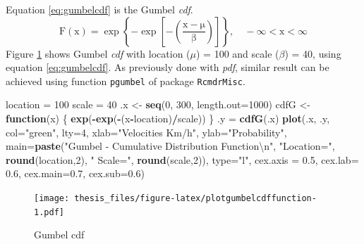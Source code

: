 \documentclass[12pt,oneside]{reedthesis}
\newenvironment{Shaded}{\begin{snugshade}}{\end{snugshade}}
\newcommand{\CharTok}[1]{\textcolor[rgb]{0.31,0.60,0.02}{#1}}
\newcommand{\ControlFlowTok}[1]{\textcolor[rgb]{0.13,0.29,0.53}{\textbf{#1}}}
\newcommand{\DataTypeTok}[1]{\textcolor[rgb]{0.13,0.29,0.53}{#1}}
\newcommand{\DecValTok}[1]{\textcolor[rgb]{0.00,0.00,0.81}{#1}}
\newcommand{\FloatTok}[1]{\textcolor[rgb]{0.00,0.00,0.81}{#1}}
\newcommand{\KeywordTok}[1]{\textcolor[rgb]{0.13,0.29,0.53}{\textbf{#1}}}
\newcommand{\NormalTok}[1]{#1}
\newcommand{\OperatorTok}[1]{\textcolor[rgb]{0.81,0.36,0.00}{\textbf{#1}}}
\newcommand{\StringTok}[1]{\textcolor[rgb]{0.31,0.60,0.02}{#1}}
\begin{document}
Equation \eqref{eq:gumbelcdf} is the Gumbel \emph{cdf}.
\begin{equation}
\mathrm{
        F(x) = \exp\left\{-\exp\left[-\left(\frac{x-\mu}{\beta}\right)\right]\right\}, 
        \quad -\infty < x < \infty
        }
  \label{eq:gumbelcdf}
\end{equation}
Figure \ref{fig:plotgumbelcdffunction} shows Gumbel \emph{cdf} with location (\(\mu\)) = 100 and scale (\(\beta\)) = 40, using equation \eqref{eq:gumbelcdf}. As previously done with \emph{pdf}, similar result can be achieved using function \texttt{pgumbel} of package \texttt{RcmdrMisc}.

\footnotesize
\begin{Shaded}
\begin{Highlighting}[]
\NormalTok{location =}\StringTok{ }\DecValTok{100}
\NormalTok{scale =}\StringTok{ }\DecValTok{40}
\NormalTok{.x <-}\StringTok{ }\KeywordTok{seq}\NormalTok{(}\DecValTok{0}\NormalTok{, }\DecValTok{300}\NormalTok{, }\DataTypeTok{length.out=}\DecValTok{1000}\NormalTok{)}
\NormalTok{cdfG <-}\StringTok{ }\ControlFlowTok{function}\NormalTok{(x) \{}
  \KeywordTok{exp}\NormalTok{(}\OperatorTok{-}\KeywordTok{exp}\NormalTok{(}\OperatorTok{-}\NormalTok{(x}\OperatorTok{-}\NormalTok{location)}\OperatorTok{/}\NormalTok{scale))}
\NormalTok{  \}}
\NormalTok{.y =}\StringTok{ }\KeywordTok{cdfG}\NormalTok{(.x)}
\KeywordTok{plot}\NormalTok{(.x, .y, }\DataTypeTok{col=}\StringTok{"green"}\NormalTok{, }\DataTypeTok{lty=}\DecValTok{4}\NormalTok{, }
     \DataTypeTok{xlab=}\StringTok{"Velocities Km/h"}\NormalTok{, }\DataTypeTok{ylab=}\StringTok{"Probability"}\NormalTok{, }
     \DataTypeTok{main=}\KeywordTok{paste}\NormalTok{(}\StringTok{"Gumbel - Cumulative Distribution Function}\CharTok{\textbackslash{}n}\StringTok{"}\NormalTok{, }\StringTok{"Location="}\NormalTok{, }
     \KeywordTok{round}\NormalTok{(location,}\DecValTok{2}\NormalTok{), }\StringTok{" Scale="}\NormalTok{, }\KeywordTok{round}\NormalTok{(scale,}\DecValTok{2}\NormalTok{)), }\DataTypeTok{type=}\StringTok{"l"}\NormalTok{, }
     \DataTypeTok{cex.axis =} \FloatTok{0.5}\NormalTok{, }\DataTypeTok{cex.lab=} \FloatTok{0.6}\NormalTok{, }\DataTypeTok{cex.main=}\FloatTok{0.7}\NormalTok{, }\DataTypeTok{cex.sub=}\FloatTok{0.6}\NormalTok{)}
\end{Highlighting}
\end{Shaded}
\begin{figure}
\centering
\texttt{[image: thesis\_files/figure-latex/plotgumbelcdffunction-1.pdf]}
\caption{\label{fig:plotgumbelcdffunction}Gumbel cdf}
\end{figure}
\normalsize
\end{document}
